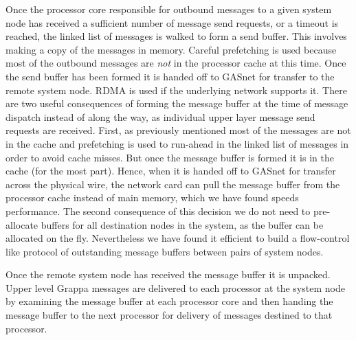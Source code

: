 Once the processor core responsible for outbound messages to a given system node has received a sufficient number of message send requests, or a timeout is reached, the linked list of messages is walked to form a send buffer.  This involves making a copy of the messages in memory.  Careful prefetching is used because most of the outbound messages are \emph{not} in the processor cache at this time.  Once the send buffer has been formed it is handed off to GASnet for transfer to the remote system node.  RDMA is used if the underlying network supports it.  There are two useful consequences of forming the message buffer at the time of message dispatch instead of along the way, as individual upper layer message send requests are received.  First, as previously mentioned most of the messages are not in the cache and prefetching is used to run-ahead in the linked list of messages in order to avoid cache misses.  But once the message buffer is formed it is in the cache (for the most part).  Hence, when it is handed off to GASnet for transfer across the physical wire, the network card can pull the message buffer from the processor cache instead of main memory, which we have found speeds performance.  The second consequence of this decision we do not need to pre-allocate buffers for all destination nodes in the system, as the buffer can be allocated on the fly.  Nevertheless we have found it efficient to build a flow-control like protocol of outstanding message buffers between pairs of system nodes.

Once the remote system node has received the message buffer it is unpacked.  Upper level Grappa messages are delivered to each processor at the system node by examining the message buffer at each processor core and then handing the message buffer to the next processor for delivery of messages destined to that processor.




